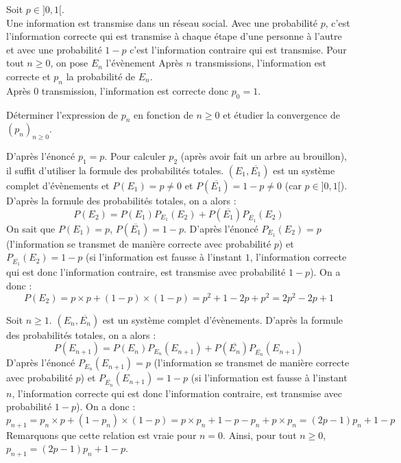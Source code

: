 \documentclass[a4paper,10pt]{report}
\begin{document}
\begin{Exercice}{} Soit $p \in ]0,1[$. \\
Une information est transmise dans un réseau social. Avec une probabilité $p$, c'est l'information correcte qui est transmise à chaque étape d'une personne à l'autre et avec une probabilité $1-p$ c'est l'information contraire qui est transmise. Pour tout $n \geq 0$, on pose $E_n$ l'évènement \og Après $n$ transmissions, l'information est correcte \fg et $p_n$ la probabilité de $E_n$. \\
\noindent Après 0 transmission, l'information est correcte donc $p_0=1$.

\medskip Déterminer l'expression de $p_n$ en fonction de $n \geq 0$ et étudier la convergence de $(p_n)_{n \geq 0}$.
\end{Exercice}

\corr D'après l'énoncé $p_1=p$. Pour calculer $p_2$ (après avoir fait un arbre au brouillon), il suffit d'utiliser la formule des probabilités totales. $(E_1, \overline{E_1})$ est un système complet d'évènements et $P(E_1)=p \neq 0$ et $P(\overline{E_1})=1-p \neq 0$ (car $p \in ]0,1[$). D'après la formule des probabilités totales, on a alors :
\[ P(E_2)=P(E_1)P_{E_1}(E_2) + P( \overline{E_1}) P_{\overline{E_1}}(E_2) \]
On sait que $P(E_1)=p$, $P(\overline{E_1})=1-p$. D'après l'énoncé $P_{E_1}(E_2)=p$ (l'information se transmet de manière correcte avec probabilité $p$) et $P_{\overline{E_1}}(E_2)=1-p$ (si l'information est fausse à l'instant $1$, l'information correcte qui est donc l'information contraire, est transmise avec probabilité $1-p$). On a donc :
\[ P(E_2)= p\times p + (1-p)\times (1-p) = p^2 + 1 -2p+p^2 = 2p^2-2p+1\]

\medskip

\noindent Soit $n \geq 1$. $(E_n, \overline{E_n})$ est un système complet d'évènements. D'après la formule des probabilités totales, on a alors :
\[ P(E_{n+1})=P(E_n)P_{E_n}(E_{n+1}) + P( \overline{E_n}) P_{\overline{E_n}}(E_{n+1}) \]
D'après l'énoncé $P_{E_n}(E_{n+1})=p$ (l'information se transmet de manière correcte avec probabilité $p$) et $P_{\overline{E_n}}(E_{n+1})=1-p$ (si l'information est fausse à l'instant $n$, l'information correcte qui est donc l'information contraire, est transmise avec probabilité $1-p$). On a donc :
\[ p_{n+1} = p_n \times p + (1-p_n)\times (1-p) = p \times p_n + 1 -p -p_n+ p \times p_n = (2p-1)p_n + 1-p \]
Remarquons que cette relation est vraie pour $n=0$. Ainsi, pour tout $n \geq 0$, $p_{n+1}=(2p-1)p_n+1-p$.
\end{document}
